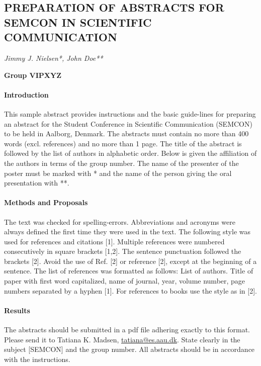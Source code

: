 \documentclass[a4paper]{article}
\title{}
\begin{document}

{\centering
\subsection*{PREPARATION OF ABSTRACTS FOR SEMCON IN SCIENTIFIC COMMUNICATION}}

{\centering
\textit{Jimmy J. Nielsen*, John Doe**}
\par}
{\centering
\textbf{Group VIPXYZ}
\par}


\bigskip

\paragraph{Introduction}
This sample abstract provides instructions and the basic guide-lines for preparing an abstract for the Student Conference in Scientific Communication (SEMCON) to be held in Aalborg, Denmark. The abstracts must contain no more than 400 words (excl. references) and no more than 1 page. The title of the abstract is followed by the list of authors in alphabetic order. Below is given the affiliation of the authors in terms of the group number. The name of the presenter of the poster must be marked with {\textquotedbl}*{\textquotedbl} and the name of the person giving the oral presentation with {\textquotedbl}**{\textquotedbl}.

\paragraph{Methods and Proposals}
The text was checked for spelling-errors. Abbreviations and acronyms were always defined the first time they were used in the text. The following style was used for references and citations [1]. Multiple references were numbered consecutively in square brackets [1,2]. The sentence punctuation followed the brackets [2]. Avoid the use of {\textquotedbl}Ref. [2]{\textquotedbl} or {\textquotedbl}reference [2]{\textquotedbl}, except at the beginning of a sentence. The list of references was formatted as follows: List of authors. Title of paper with first word capitalized, name of journal, year, volume number, page numbers separated by a hyphen [1]. For references to books use the style as in [2].


\paragraph{Results}
The abstracts should be submitted in a pdf file adhering exactly to this format. Please send it to Tatiana K. Madsen, \href{mailto:tatiana@es.aau.dk}{tatiana@es.aau.dk}. State clearly in the subject [SEMCON] and the group number. All abstracts should be in accordance with the instructions.
\end{document}
